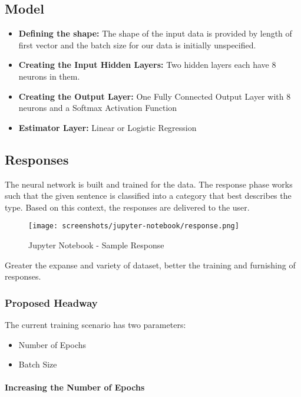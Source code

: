 \subsection{Model}

\begin{itemize}
    \item \textbf{Defining the shape:} The shape of the input data is provided by length of first vector and  the batch size for our data is initially unspecified.
    \item \textbf{Creating the Input Hidden Layers:} Two hidden layers each have 8 neurons in them.
    \item \textbf{Creating the Output Layer:} One Fully Connected Output Layer with 8 neurons and a Softmax Activation Function
    \item \textbf{Estimator Layer:} Linear or Logistic Regression    
\end{itemize}

\pagebreak

\subsection{Responses}

The neural network is built and trained for the data. The response phase works such that the given sentence is classified into a category that best describes the type. Based on this context, the responses are delivered to the user.

\begin{figure}[H]
    \centering
    \texttt{[image: screenshots/jupyter-notebook/response.png]}
    \caption{Jupyter Notebook - Sample Response}
\end{figure}

Greater the expanse and variety of dataset, better the training and furnishing of responses.

\subsubsection{Proposed Headway}

The current training scenario has two parameters:
\begin{itemize}
    \item Number of Epochs
    \item Batch Size
\end{itemize}

\paragraph{Increasing the Number of Epochs}

